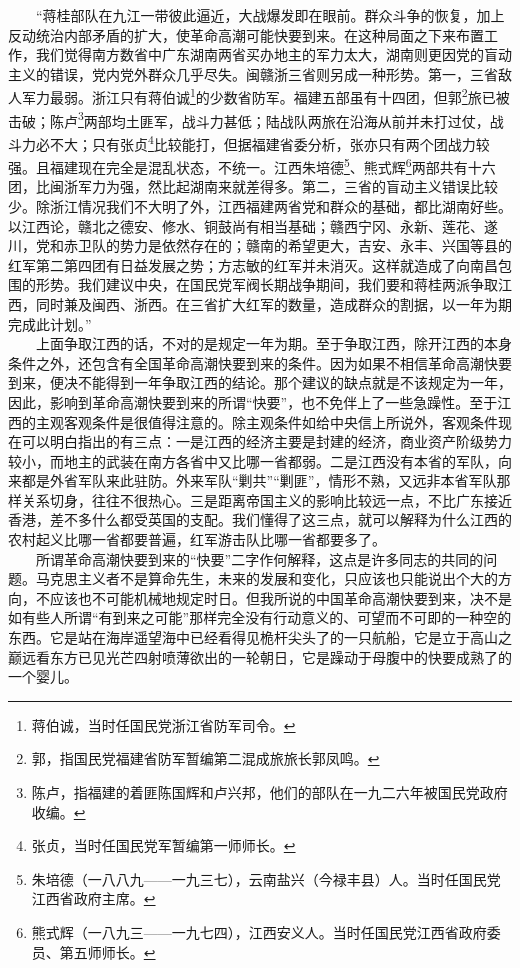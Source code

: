 \documentclass[cn,11pt,chinese]{elegantbook}
\begin{document}
　　“蒋桂部队在九江一带彼此逼近，大战爆发即在眼前。群众斗争的恢复，加上反动统治内部矛盾的扩大，使革命高潮可能快要到来。在这种局面之下来布置工作，我们觉得南方数省中广东湖南两省买办地主的军力太大，湖南则更因党的盲动主义的错误，党内党外群众几乎尽失。闽赣浙三省则另成一种形势。第一，三省敌人军力最弱。浙江只有蒋伯诚\footnote[14]{ 蒋伯诚，当时任国民党浙江省防军司令。}的少数省防军。福建五部虽有十四团，但郭\footnote[15]{ 郭，指国民党福建省防军暂编第二混成旅旅长郭凤鸣。}旅已被击破；陈卢\footnote[16]{ 陈卢，指福建的着匪陈国辉和卢兴邦，他们的部队在一九二六年被国民党政府收编。}两部均土匪军，战斗力甚低；陆战队两旅在沿海从前并未打过仗，战斗力必不大；只有张贞\footnote[17]{ 张贞，当时任国民党军暂编第一师师长。}比较能打，但据福建省委分析，张亦只有两个团战力较强。且福建现在完全是混乱状态，不统一。江西朱培德\footnote[18]{ 朱培德（一八八九——一九三七），云南盐兴（今禄丰县）人。当时任国民党江西省政府主席。}、熊式辉\footnote[19]{ 熊式辉（一八九三——一九七四），江西安义人。当时任国民党江西省政府委员、第五师师长。}两部共有十六团，比闽浙军力为强，然比起湖南来就差得多。第二，三省的盲动主义错误比较少。除浙江情况我们不大明了外，江西福建两省党和群众的基础，都比湖南好些。以江西论，赣北之德安、修水、铜鼓尚有相当基础；赣西宁冈、永新、莲花、遂川，党和赤卫队的势力是依然存在的；赣南的希望更大，吉安、永丰、兴国等县的红军第二第四团有日益发展之势；方志敏的红军并未消灭。这样就造成了向南昌包围的形势。我们建议中央，在国民党军阀长期战争期间，我们要和蒋桂两派争取江西，同时兼及闽西、浙西。在三省扩大红军的数量，造成群众的割据，以一年为期完成此计划。”\\
　　上面争取江西的话，不对的是规定一年为期。至于争取江西，除开江西的本身条件之外，还包含有全国革命高潮快要到来的条件。因为如果不相信革命高潮快要到来，便决不能得到一年争取江西的结论。那个建议的缺点就是不该规定为一年，因此，影响到革命高潮快要到来的所谓“快要”，也不免伴上了一些急躁性。至于江西的主观客观条件是很值得注意的。除主观条件如给中央信上所说外，客观条件现在可以明白指出的有三点：一是江西的经济主要是封建的经济，商业资产阶级势力较小，而地主的武装在南方各省中又比哪一省都弱。二是江西没有本省的军队，向来都是外省军队来此驻防。外来军队“剿共”“剿匪”，情形不熟，又远非本省军队那样关系切身，往往不很热心。三是距离帝国主义的影响比较远一点，不比广东接近香港，差不多什么都受英国的支配。我们懂得了这三点，就可以解释为什么江西的农村起义比哪一省都要普遍，红军游击队比哪一省都要多了。\\
　　所谓革命高潮快要到来的“快要”二字作何解释，这点是许多同志的共同的问题。马克思主义者不是算命先生，未来的发展和变化，只应该也只能说出个大的方向，不应该也不可能机械地规定时日。但我所说的中国革命高潮快要到来，决不是如有些人所谓“有到来之可能”那样完全没有行动意义的、可望而不可即的一种空的东西。它是站在海岸遥望海中已经看得见桅杆尖头了的一只航船，它是立于高山之巅远看东方已见光芒四射喷薄欲出的一轮朝日，它是躁动于母腹中的快要成熟了的一个婴儿。\\
\end{document}
